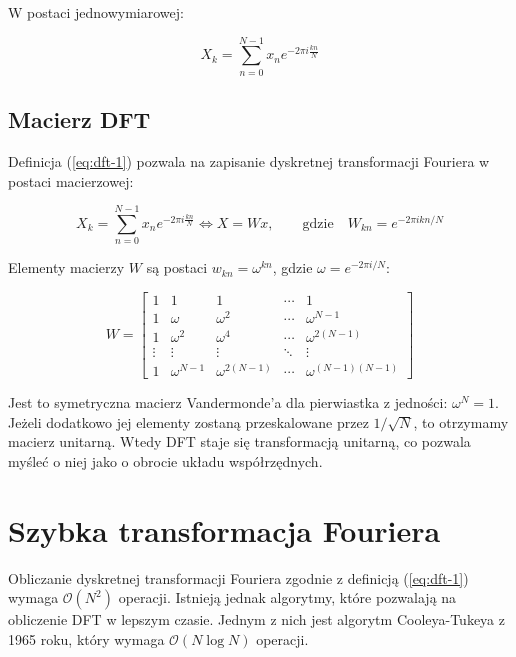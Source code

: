 \documentclass[polish, titlepage, 12pt]{article}
\begin{document}
W postaci jednowymiarowej:

\begin{equation}\label{eq:dft-1}
    X_k = \sum_{n=0}^{N-1} x_n e^{-2\pi i \frac{kn}{N}}
\end{equation}

\subsection{Macierz DFT}
Definicja (\ref*{eq:dft-1}) pozwala na zapisanie dyskretnej transformacji Fouriera
w postaci macierzowej:

\begin{equation}\label{eq:dft-matrix-eq}
    X_k = \sum_{n=0}^{N-1} x_n e^{-2\pi i \frac{kn}{N}}
    \Longleftrightarrow X = Wx,
    \qquad \text{gdzie} \quad
    W_{kn} = e^{-2\pi i kn / N}
\end{equation}

Elementy macierzy \(W\) są postaci \( w_{kn} = \omega^{kn} \), gdzie \( \omega = e^{-2\pi i / N} \):

\begin{equation}\label{eq:dft-matrix}
    W = \begin{bmatrix}
        1 & 1 & 1 & \cdots  & 1 \\
        1 & \omega & \omega^2 & \cdots  & \omega^{N-1} \\
        1 & \omega^2 & \omega^4 & \cdots  & \omega^{2(N-1)} \\
        \vdots & \vdots & \vdots & \ddots & \vdots \\
        1 & \omega^{N-1} & \omega^{2(N-1)} & \cdots  & \omega^{(N-1)(N-1)}
    \end{bmatrix}
\end{equation}

Jest to symetryczna macierz Vandermonde'a dla pierwiastka z jedności: \(\omega^N = 1\).
Jeżeli dodatkowo jej elementy zostaną przeskalowane przez \(1/\sqrt{N}\), to otrzymamy macierz
unitarną. Wtedy DFT staje się transformacją unitarną, co pozwala myśleć o niej jako o
obrocie układu współrzędnych.



\section{Szybka transformacja Fouriera}
Obliczanie dyskretnej transformacji Fouriera zgodnie z definicją (\ref{eq:dft-1}) wymaga
\( \mathcal{O}(N^2) \) operacji. Istnieją jednak algorytmy, które pozwalają na obliczenie
DFT w lepszym czasie. Jednym z nich jest algorytm Cooleya-Tukeya z 1965 roku, który wymaga
\( \mathcal{O}(N \log N) \) operacji.
\end{document}
